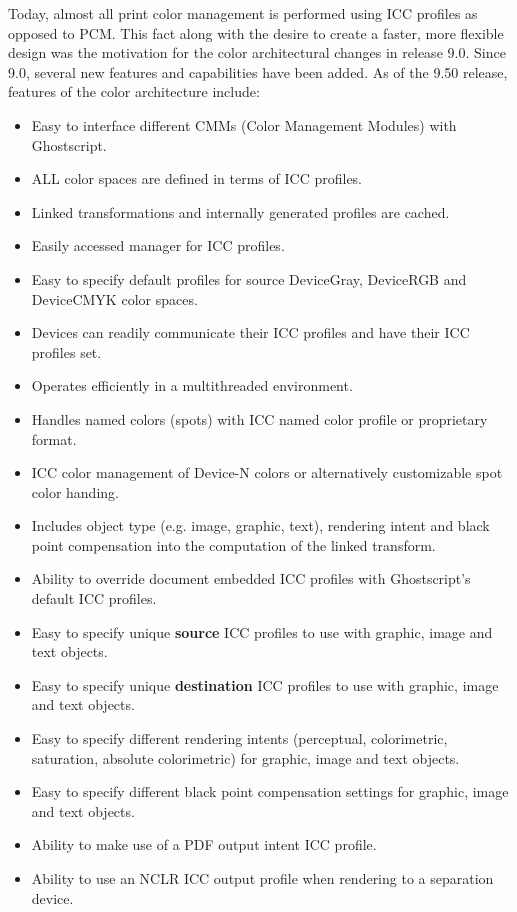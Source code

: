 \documentclass[12pt,notitlepage]{article}
\begin{document}
Today, almost all print color management is performed using ICC profiles as opposed to PCM.  This fact along with the desire to create a faster, more flexible design was the motivation for the color architectural changes in release 9.0.  Since 9.0, several new features and capabilities  have been added. As of the 9.50 release, features of the color architecture include:
\begin{itemize}
\item Easy to interface different CMMs (Color Management Modules) with Ghostscript.
\item ALL color spaces are defined in terms of ICC profiles.
\item Linked transformations and internally generated profiles are cached.
\item Easily accessed manager for ICC profiles.
\item Easy to specify default profiles for source DeviceGray, DeviceRGB and DeviceCMYK color spaces.
\item Devices can readily communicate their ICC profiles and have their ICC profiles set.
\item Operates efficiently in a multithreaded environment.
\item Handles named colors (spots) with ICC named color profile or proprietary format.
\item ICC color management of Device-N colors or alternatively customizable spot color handing.
\item Includes object type (e.g. image, graphic, text), rendering intent and black point compensation into the computation of the linked transform.
\item Ability to override document embedded ICC profiles with Ghostscript's default ICC profiles.
\item Easy to specify unique {\bf source} ICC profiles to use with graphic, image and text objects.
\item Easy to specify unique {\bf destination} ICC profiles to use with graphic, image and text objects.
\item Easy to specify different rendering intents (perceptual, colorimetric, saturation, absolute colorimetric) for graphic, image and text objects.
\item Easy to specify different black point compensation settings for graphic, image and text objects.
\item Ability to make use of a PDF output intent ICC profile.
\item Ability to use an NCLR ICC output profile when rendering to a separation device.

\end{itemize}
\end{document}
